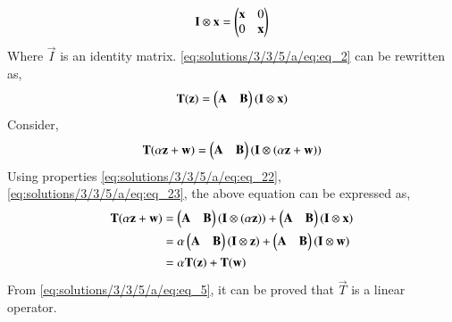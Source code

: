 \begin{align} 
    \mathbf{I} \otimes \mathbf{x} = \begin{pmatrix}\mathbf{x} & 0 \\ 0 & \mathbf{x}\end{pmatrix} \label{eq:solutions/3/3/5/a/eq:eq_3}
\end{align}
Where $\vec{I}$ is an identity matrix. \eqref{eq:solutions/3/3/5/a/eq:eq_2} can be rewritten as,
\begin{align}
    \mathbf{T} (\mathbf{z}) = \begin{pmatrix}\mathbf{A} & \mathbf{B}\end{pmatrix} (\mathbf{I} \otimes \mathbf{x}) \label{eq:solutions/3/3/5/a/eq:eq_4}
\end{align}
Consider,
\begin{align}
    \mathbf{T}(\alpha \mathbf{z} + \mathbf{w}) = \begin{pmatrix}\mathbf{A} & \mathbf{B}\end{pmatrix} (\mathbf{I} \otimes (\alpha \mathbf{z} + \mathbf{w})) \nonumber 
\end{align}
Using properties \eqref{eq:solutions/3/3/5/a/eq:eq_22}, \eqref{eq:solutions/3/3/5/a/eq:eq_23}, the above equation can be expressed as,
\begin{align}
    \mathbf{T}(\alpha \mathbf{z} + \mathbf{w}) &=  
    \begin{pmatrix}\mathbf{A} & \mathbf{B}\end{pmatrix} (\mathbf{I} \otimes (\alpha \mathbf{z})) +
    \begin{pmatrix}\mathbf{A} & \mathbf{B}\end{pmatrix} (\mathbf{I} \otimes \mathbf{x}) \nonumber \\
    &= \alpha \begin{pmatrix}\mathbf{A} & \mathbf{B}\end{pmatrix} (\mathbf{I} \otimes \mathbf{z}) + 
    \begin{pmatrix}\mathbf{A} & \mathbf{B}\end{pmatrix} (\mathbf{I} \otimes \mathbf{w}) \nonumber \\ 
    &= \alpha \mathbf{T} (\mathbf{z}) + \mathbf{T} (\mathbf{w})\label{eq:solutions/3/3/5/a/eq:eq_5}
\end{align}
From \eqref{eq:solutions/3/3/5/a/eq:eq_5}, it can be proved that $\vec{T}$ is a linear operator.

